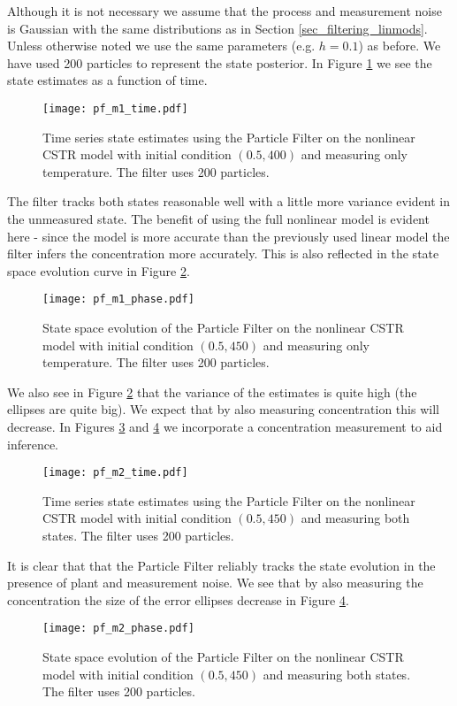 Although it is not necessary we assume that the process and measurement noise is Gaussian with the same distributions as in Section \ref{sec_filtering_linmods}. Unless otherwise noted we use the same parameters (e.g. $h=0.1$) as before. We have used 200 particles to represent the state posterior. In Figure \ref{fig_pf_m1_time} we see the state estimates as a function of time.
\begin{figure}[H] 
\centering
\texttt{[image: pf\_m1\_time.pdf]}
\caption{Time series state estimates using the Particle Filter on the nonlinear CSTR model with initial condition $(0.5, 400)$ and measuring only temperature. The filter uses 200 particles.}
\label{fig_pf_m1_time}
\end{figure}
The filter tracks both states reasonable well with a little more variance evident in the unmeasured state. The benefit of using the full nonlinear model is evident here - since the model is more accurate than the previously used linear model the filter infers the concentration more accurately. This is also reflected in the state space evolution curve in Figure \ref{fig_pf_m1_phase}.
\begin{figure}[H] 
\centering
\texttt{[image: pf\_m1\_phase.pdf]}
\caption{State space evolution of the Particle Filter on the nonlinear CSTR model with initial condition $(0.5, 450)$ and measuring only temperature. The filter uses 200 particles.}
\label{fig_pf_m1_phase}
\end{figure}
We also see in Figure \ref{fig_pf_m1_phase} that the variance of the estimates is quite high (the ellipses are quite big). We expect that by also measuring concentration this will decrease. In Figures \ref{fig_pf_m2_time} and \ref{fig_pf_m2_phase} we incorporate a concentration measurement to aid inference. 
\begin{figure}[H] 
\centering
\texttt{[image: pf\_m2\_time.pdf]}
\caption{Time series state estimates using the Particle Filter on the nonlinear CSTR model with initial condition $(0.5, 450)$ and measuring both states. The filter uses 200 particles.}
\label{fig_pf_m2_time}
\end{figure}
It is clear that that the Particle Filter reliably tracks the state evolution in the presence of plant and measurement noise. We see that by also measuring the concentration the size of the error ellipses decrease in Figure \ref{fig_pf_m2_phase}. 
\begin{figure}[H] 
\centering
\texttt{[image: pf\_m2\_phase.pdf]}
\caption{State space evolution of the Particle Filter on the nonlinear CSTR model with initial condition $(0.5, 450)$ and measuring both states. The filter uses 200 particles.}
\label{fig_pf_m2_phase}
\end{figure}
